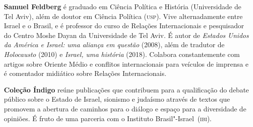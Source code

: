 \textbf{Samuel Feldberg} é graduado em Ciência Política e História (Universidade de Tel Aviv), além de doutor em Ciência Política (\textsc{usp}). Vive alternadamente entre Israel e o Brasil, e é professor do curso de Relações Internacionais e pesquisador do Centro Moshe Dayan da Universidade de Tel Aviv. É autor de \textit{Estados Unidos da América e Israel: uma aliança em questão} (2008), além de tradutor de \textit{Holocausto} (2010) e \textit{Israel, uma história} (2018). Colabora constantemente com artigos sobre Oriente Médio e conflitos internacionais para veículos de imprensa e é comentador midiático sobre Relações Internacionais.

\textbf{Coleção Índigo} reúne publicações que contribuem para a qualificação 
do debate público sobre o Estado
de Israel, sionismo e judaísmo através de textos que promovem a abertura de
caminhos para o diálogo e espaço para a diversidade de opiniões.
É fruto de uma parceria com o Instituto Brasil"-Israel~(\textsc{ibi}).\par

